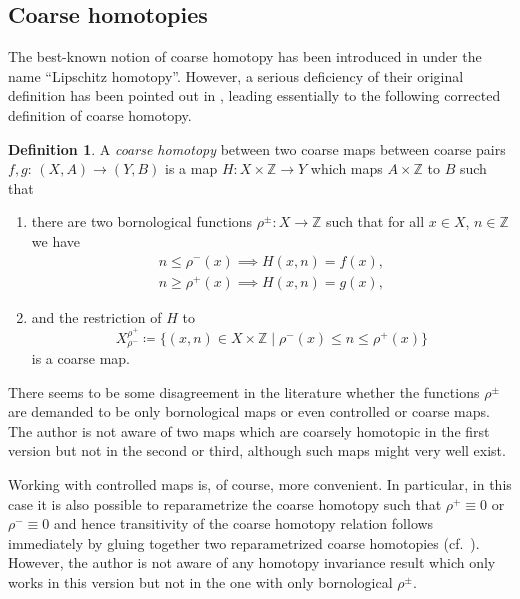 \documentclass[pdftex]{sigma}
\numberwithin{equation}{section}
\theoremstyle{definition}
\newtheorem{defn}[thm]{Definition}
\newcommand{\Z}{\mathbb{Z}}
\begin{document}
\subsection{Coarse homotopies}
\label{sec:coarsehomotopies}

The best-known notion of coarse homotopy has been introduced in \cite[Definition 11.1]{HigsonPedersenRoe} under the name ``Lipschitz homotopy''. However, a serious deficiency of their original definition has been pointed out in \cite[Remark 3.18]{BartelsSqueezing}, leading essentially to the following corrected definition of coarse homotopy.

\begin{defn}\label{def:originalcoarsehomotopy}
A \emph{coarse homotopy} between two coarse maps between coarse pairs $f,g$: $(X,A)\to (Y,B)$ is a map $H\colon X\times\Z\to Y$ which maps $A\times \Z$ to $B$ such that
\begin{enumerate}\itemsep=0pt
\item[$\bullet$] there are two bornological functions $\rho^\pm\colon X\to\Z$ such that for all $x\in X$, $n\in\Z$ we have
\begin{gather*}
n\leq\rho^-(x)\implies H(x,n)=f(x),
\\n\geq\rho^+(x)\implies H(x,n)=g(x),
\end{gather*}
\item[$\bullet$] and the restriction of $H$ to
\[
X_{\rho^-}^{\rho^+}\coloneqq\{(x,n)\in X\times\Z\mid\rho^-(x)\leq n\leq\rho^+(x)\}
\]
is a coarse map.
\end{enumerate}
\end{defn}
There seems to be some disagreement in the literature whether the functions $\rho^\pm$ are demanded to be only bornological maps or even controlled or coarse maps.
The author is not aware of two maps which are coarsely homotopic in the first version but not in the second or third, although such maps might very well exist.

Working with controlled maps is, of course, more convenient. In particular, in this case it is also possible to reparametrize the coarse homotopy such that $\rho^+\equiv 0$ or $\rho^-\equiv 0$ and hence transitivity of the coarse homotopy relation follows immediately by gluing together two reparametrized coarse homotopies (cf.\ \cite[Theorem 2.4]{MitchenerNorouzizadehSchick}).
However, the author is not aware of any homotopy invariance result which only works in this version but not in the one with only bornological $\rho^\pm$.
\end{document}
